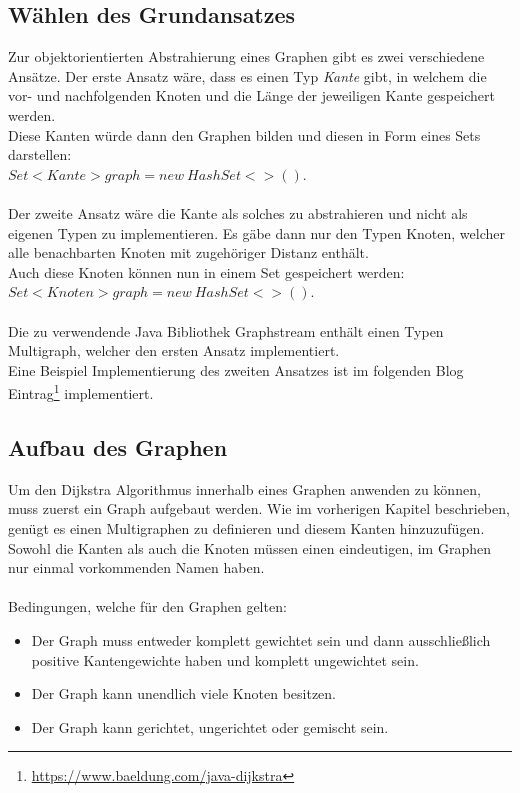 \documentclass[a4paper]{article}
\begin{document}
\subsection{Wählen des Grundansatzes}

Zur objektorientierten Abstrahierung eines Graphen gibt es zwei verschiedene Ansätze. Der erste Ansatz wäre, dass es einen Typ \textit{Kante} gibt, in welchem die vor- und nachfolgenden Knoten und die Länge der jeweiligen Kante gespeichert werden.\\
Diese Kanten würde dann den Graphen bilden und diesen in Form eines Sets darstellen:\\$Set <Kante> graph = new\ HashSet<>()$.\\\\
Der zweite Ansatz wäre die Kante als solches zu abstrahieren und nicht als eigenen Typen zu implementieren. Es gäbe dann nur den Typen Knoten, welcher alle benachbarten Knoten mit zugehöriger Distanz enthält.\\
Auch diese Knoten können nun in einem Set gespeichert werden:\\
$Set<Knoten> graph = new\ HashSet<>()$.\\\\
Die zu verwendende Java Bibliothek Graphstream enthält einen Typen Multigraph, welcher den ersten Ansatz implementiert.\\
Eine Beispiel Implementierung des zweiten Ansatzes ist im folgenden Blog Eintrag\footnote{\url{https://www.baeldung.com/java-dijkstra}} implementiert.



\subsection{Aufbau des Graphen}

Um den Dijkstra Algorithmus innerhalb eines Graphen anwenden zu können, muss zuerst ein Graph aufgebaut werden.
Wie im vorherigen Kapitel beschrieben, genügt es einen Multigraphen zu definieren und diesem Kanten hinzuzufügen.
Sowohl die Kanten als auch die Knoten müssen einen eindeutigen, im Graphen nur einmal vorkommenden Namen haben.\\\\
Bedingungen, welche für den Graphen gelten:
\begin{itemize}
    \item Der Graph muss entweder komplett gewichtet sein und dann ausschließlich positive Kantengewichte haben und komplett ungewichtet sein.
    \item Der Graph kann unendlich viele Knoten besitzen.
    \item Der Graph kann gerichtet, ungerichtet oder gemischt sein.
\end{itemize}
\end{document}
